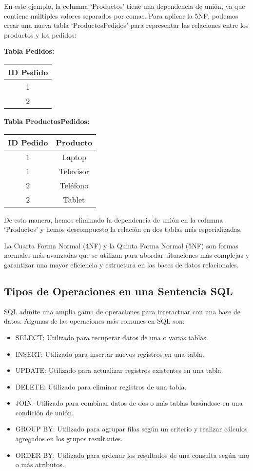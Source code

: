 \documentclass[executivepaper]{article}
\begin{document}
En este ejemplo, la columna \enquote*{Productos} tiene una dependencia de unión, ya que contiene múltiples valores separados por comas. Para aplicar la 5NF, podemos crear una nueva tabla \enquote*{ProductosPedidos} para representar las relaciones entre los productos y los pedidos:

\textbf{Tabla Pedidos:}
\begin{center}
\begin{tabular}{|c|}
\hline
\textbf{ID Pedido} \\
\hline
1 \\
\hline
2 \\
\hline
\end{tabular}
\end{center}

\textbf{Tabla ProductosPedidos:}
\begin{center}
\begin{tabular}{|c|c|}
\hline
\textbf{ID Pedido} & \textbf{Producto} \\
\hline
1 & Laptop \\
\hline
1 & Televisor \\
\hline
2 & Teléfono \\
\hline
2 & Tablet \\
\hline
\end{tabular}
\end{center}

De esta manera, hemos eliminado la dependencia de unión en la columna \enquote*{Productos} y hemos descompuesto la relación en dos tablas más especializadas.

La Cuarta Forma Normal (4NF) y la Quinta Forma Normal (5NF) son formas normales más avanzadas que se utilizan para abordar situaciones más complejas y garantizar una mayor eficiencia y estructura en las bases de datos relacionales.

\subsection{Tipos de Operaciones en una Sentencia SQL}

SQL admite una amplia gama de operaciones para interactuar con una base de datos. Algunas de las operaciones más comunes en SQL son:

\begin{itemize}
\item SELECT: Utilizado para recuperar datos de una o varias tablas.
\item INSERT: Utilizado para insertar nuevos registros en una tabla.
\item UPDATE: Utilizado para actualizar registros existentes en una tabla.
\item DELETE: Utilizado para eliminar registros de una tabla.
\item JOIN: Utilizado para combinar datos de dos o más tablas basándose en una condición de unión.
\item GROUP BY: Utilizado para agrupar filas según un criterio y realizar cálculos agregados en los grupos resultantes.
\item ORDER BY: Utilizado para ordenar los resultados de una consulta según uno o más atributos.
\end{itemize}
\end{document}
